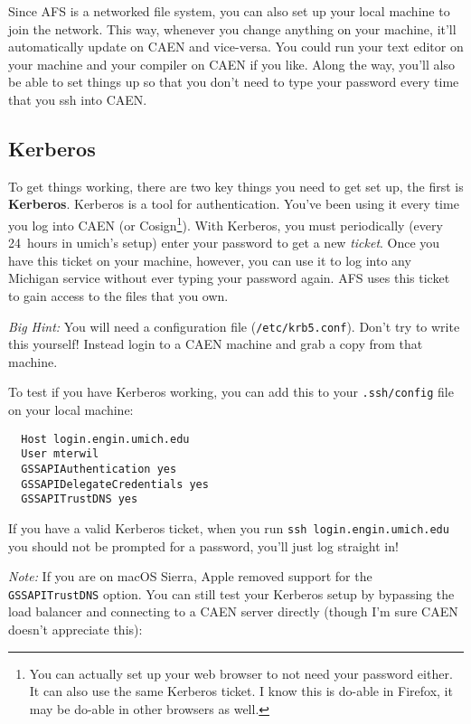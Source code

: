 \documentclass{article}
\begin{document}
Since AFS is a networked file system, you can also set up your local machine
to join the network.  This way, whenever you change anything on your machine,
it'll automatically update on CAEN and vice-versa. You could run your text
editor on your machine and your compiler on CAEN if you like. Along the way,
you'll also be able to set things up so that you don't need to type your
password every time that you ssh into CAEN.


\subsection*{Kerberos}

To get things working, there are two key things you need to get set up, the
first is \textbf{Kerberos}. Kerberos is a tool for authentication. You've been
using it every time you log into CAEN (or Cosign\footnote{
  You can actually set up your web browser to not need your password either.
  It can also use the same Kerberos ticket. I know this is do-able in Firefox,
  it may be do-able in other browsers as well.
}). With Kerberos, you must periodically (every 24~hours in umich's setup)
enter your password to get a new \emph{ticket}. Once you have this ticket on
your machine, however, you can use it to log into any Michigan service without
ever typing your password again. AFS uses this ticket to gain access to the
files that you own.

\emph{Big Hint:} You will need a configuration file (\texttt{/etc/krb5.conf}).
Don't try to write this yourself! Instead login to a CAEN machine and grab a
copy from that machine.

To test if you have Kerberos working, you can add this to your
\texttt{.ssh/config} file on your local machine:

\begin{lstlisting}
  Host login.engin.umich.edu
  User mterwil
  GSSAPIAuthentication yes
  GSSAPIDelegateCredentials yes
  GSSAPITrustDNS yes
\end{lstlisting}

If you have a valid Kerberos ticket, when you run
\texttt{ssh~login.engin.umich.edu} you should not be prompted for a password,
you'll just log straight in!

\emph{Note:} If you are on macOS Sierra, Apple removed support for the
\texttt{GSSAPITrustDNS} option. You can still test your Kerberos setup by
bypassing the load balancer and connecting to a CAEN server directly (though I'm
sure CAEN doesn't appreciate this):
\end{document}
